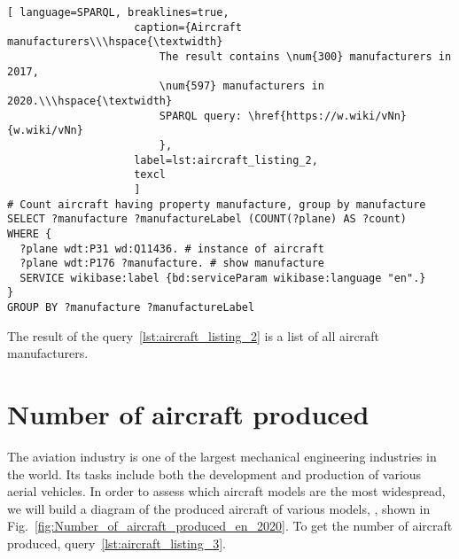 \begin{lstlisting}[ language=SPARQL, breaklines=true, 
                    caption={Aircraft manufacturers\\\hspace{\textwidth}
                        The result contains \num{300} manufacturers in 2017, 
                        \num{597} manufacturers in 2020.\\\hspace{\textwidth}
                        SPARQL query: \href{https://w.wiki/vNn}{w.wiki/vNn}
                        },
                    label=lst:aircraft_listing_2,
                    texcl 
                    ]
# Count aircraft having property manufacture, group by manufacture
SELECT ?manufacture ?manufactureLabel (COUNT(?plane) AS ?count) 
WHERE {
  ?plane wdt:P31 wd:Q11436. # instance of aircraft
  ?plane wdt:P176 ?manufacture. # show manufacture
  SERVICE wikibase:label {bd:serviceParam wikibase:language "en".}
}
GROUP BY ?manufacture ?manufactureLabel
\end{lstlisting}

The result of the query~\ref{lst:aircraft_listing_2} is a list of all aircraft manufacturers.


\label{question:aircraft_manufacturers_en}


\section{Number of aircraft produced}

The aviation industry is one of the largest mechanical engineering industries in the world. Its tasks include both the development 
and production of various aerial vehicles. In order to assess which aircraft models are the most widespread, we will build a diagram 
of the produced aircraft of various models, , shown in Fig.~\ref{fig:Number_of_aircraft_produced_en_2020}.
To get the number of aircraft produced, query~\ref{lst:aircraft_listing_3}.


